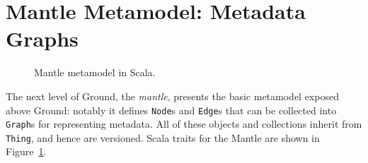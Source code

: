 \documentclass{article}
\newcommand{\core}{core\xspace}
\newcommand{\mantle}{mantle\xspace}
\newcommand{\Mantle}{Mantle\xspace}
\newcommand{\thing}{\texttt{Thing}\xspace}
\newcommand{\node}{\texttt{Node}\xspace}
\newcommand{\edge}{\texttt{Edge}\xspace}
\newcommand{\graph}{\texttt{Graph}\xspace}
\begin{document}
\section{\Mantle Metamodel: Metadata Graphs}

\begin{figure}[ht]
\begin{scriptsize}
\begin{multicols}{2}

\end{multicols}
\end{scriptsize}
\caption{\Mantle metamodel in Scala.}
\label{fig:mantle}
\end{figure}



The next level of Ground, the \emph{\mantle}, presents the basic metamodel exposed above Ground: notably it defines {\node}s and {\edge}s that can be collected into {\graph}s for representing metadata.  All of these objects and collections inherit from \thing, and hence are versioned.   Scala traits for the Mantle are shown in Figure~\ref{fig:mantle}.
\end{document}

